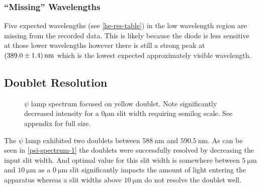 \documentclass[10pt, twocolumn]{article}
\theoremstyle{definition}
\begin{document}
\subsubsection{``Missing'' Wavelengths}
Five expected wavelengths (see \ref{he-res-table}) in the low wavelength region are missing from the recorded data.
This is likely because the diode is less sensitive at those lower wavelengths\autocite{diode-manufacturer} however there is
still a strong peak at $\qty{389\pm1.4}{\nano\meter}$ which is the lowest expected approximately visible wavelength.
\subsection{Doublet Resolution}
\begin{figure}
  \caption{$\psi$ lamp spectrum focused on yellow doublet. Note significantly decreased intensity for a $0\unit{\micro\meter}$ slit width requiring semilog scale. See appendix for full size.}
\end{figure}
The $\psi$ lamp exhibited two doublets between $\qty{588}{\nano\meter}$ and $\qty{590.5}{\nano\meter}$. As can be seen in
\ref{psi-spectrum-1} the doublets were successfully resolved by decreasing the input slit width. And optimal value for this slit
width is somewhere between $\qty{5}{\micro\meter}$ and $\qty{10}{\micro\meter}$ as a $\qty{0}{\micro\meter}$ slit significantly impacts
the amount of light entering the apparatus whereas a slit widths above $\qty{10}{\micro\meter}$ do not resolve the doublet well.
\end{document}
